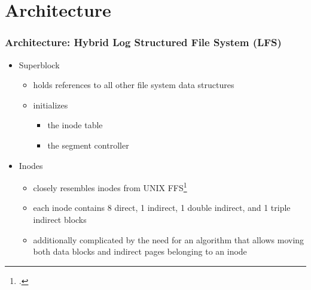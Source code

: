 \section{Architecture}
\begin{frame}
	\frametitle{Architecture: Hybrid Log Structured File System (LFS)}
	\begin{itemize}[<+->]
		\setlength\itemsep{1em}
		\item Superblock
			\begin{itemize}
				\item holds references to all other file system data structures
				\item initializes 
					\begin{itemize}
						\item the inode table 
						\item the segment controller
					\end{itemize}
			\end{itemize}
		\item Inodes
			\begin{itemize}
				\item closely resembles inodes from UNIX FFS\footcite{mckusick1984fast}
				\item each inode contains 8 direct, 1 indirect, 1 double indirect, and 1 triple indirect blocks
				\item additionally complicated by the need for an algorithm that allows moving both data blocks and indirect pages belonging to an inode
			\end{itemize}
	\end{itemize}
\end{frame}


